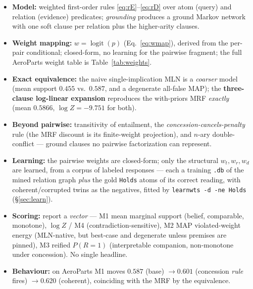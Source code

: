 \documentclass[11pt]{article}
\begin{document}
\begin{itemize}[leftmargin=*]
  \item \textbf{Model:} weighted first-order rules \eqref{eq:rE}--\eqref{eq:rD} over atom
        (query) and relation (evidence) predicates; \emph{grounding} produces a ground Markov
        network with one soft clause per relation plus the higher-arity clauses.
  \item \textbf{Weight mapping:} $w=\operatorname{logit}(p)$ (Eq.~\ref{eq:wmap}), derived from
        the per-pair conditional; closed-form, no learning for the pairwise fragment; the
        full AeroParts weight table is Table~\ref{tab:weights}.
  \item \textbf{Exact equivalence:} the naive single-implication MLN is a \emph{coarser}
        model (mean support $0.455$ vs.\ $0.587$, and a degenerate all-false MAP); the
        \textbf{three-clause log-linear expansion} reproduces the with-priors MRF \emph{exactly}
        (mean $0.5866$, $\log Z=-9.751$ for both).
  \item \textbf{Beyond pairwise:} transitivity of entailment, the
        \emph{concession-cancels-penalty} rule (the MRF discount is its finite-weight
        projection), and $n$-ary double-conflict --- ground clauses no pairwise factorization
        can represent.
  \item \textbf{Learning:} the pairwise weights are closed-form; only the structural
        $w_t,w_r,w_d$ are learned, from a corpus of labeled responses --- each a training
        \texttt{.db} of the mined relation graph \emph{plus} the gold \texttt{Holds} atoms of
        its correct reading, with coherent/corrupted twins as the negatives, fitted by
        \texttt{learnwts -d -ne Holds} (\S\ref{sec:learn}).
  \item \textbf{Scoring:} report a \emph{vector} --- M1 mean marginal support (belief,
        comparable, monotone), $\log Z$ / M4 (contradiction-sensitive), M2 MAP violated-weight
        energy (MLN-native, but best-case and degenerate unless premises are pinned), M3
        reified $P(R{=}1)$ (interpretable companion, non-monotone under concession). No single
        headline.
  \item \textbf{Behaviour:} on AeroParts M1 moves $0.587$ (base) $\to 0.601$ (concession
        \emph{rule} fires) $\to 0.620$ (coherent), coinciding with the MRF by the equivalence.
\end{itemize}
\end{document}
